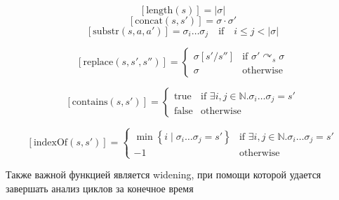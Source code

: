 $$\left[ \text{length}(s) \right] = |\sigma|$$
$$\left[ \text{concat}(s, s') \right] = \sigma \cdot \sigma'$$
$$\left[ \text{substr}(s, a, a') \right] = \sigma_i \dots \sigma_j \quad \text{if} \quad i \leq j < |\sigma|$$


\[
\left[ \text{replace}(s, s', s'') \right] = 
\begin{cases}
\sigma \left[ s' / s'' \right] & \text{if } \sigma'  \curvearrowright_s \sigma \\
\sigma & \text{otherwise}
\end{cases}
\]

$$\left[ \text{contains}(s, s') \right] = 
\begin{cases}
\text{true} & \text{if } \exists i, j \in \mathbb{N}. \sigma_i \dots \sigma_j = s' \\
\text{false} & \text{otherwise}
\end{cases}$$

$$\left[ \text{indexOf}(s, s') \right] = 
\begin{cases}
\min \left\{ i \mid \sigma_i \dots \sigma_j = s' \right\} & \text{if } \exists i, j \in \mathbb{N}. \sigma_i \dots \sigma_j = s' \\
-1 & \text{otherwise}
\end{cases}$$

Также важной функцией является widening, при помощи которой удается завершать анализ циклов за конечное время